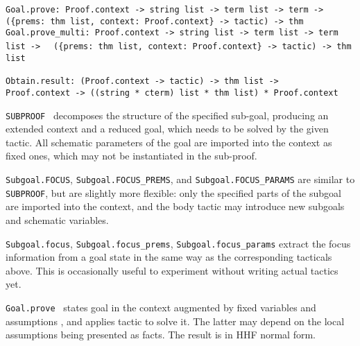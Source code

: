 \begin{isabellebody}
\begin{isamarkuptext}
  \begin{mldecls}
  \verb|Goal.prove: Proof.context -> string list -> term list -> term ->|\isasep\isanewline%
\verb|  ({prems: thm list, context: Proof.context} -> tactic) -> thm| \\
  \verb|Goal.prove_multi: Proof.context -> string list -> term list -> term list ->|\isasep\isanewline%
\verb|  ({prems: thm list, context: Proof.context} -> tactic) -> thm list| \\
  \end{mldecls}
  \begin{mldecls}
  \verb|Obtain.result: (Proof.context -> tactic) -> thm list ->|\isasep\isanewline%
\verb|  Proof.context -> ((string * cterm) list * thm list) * Proof.context| \\
  \end{mldecls}

  \begin{description}

  \item \verb|SUBPROOF|~ decomposes the structure
  of the specified sub-goal, producing an extended context and a
  reduced goal, which needs to be solved by the given tactic.  All
  schematic parameters of the goal are imported into the context as
  fixed ones, which may not be instantiated in the sub-proof.

  \item \verb|Subgoal.FOCUS|, \verb|Subgoal.FOCUS_PREMS|, and \verb|Subgoal.FOCUS_PARAMS| are similar to \verb|SUBPROOF|, but are
  slightly more flexible: only the specified parts of the subgoal are
  imported into the context, and the body tactic may introduce new
  subgoals and schematic variables.

  \item \verb|Subgoal.focus|, \verb|Subgoal.focus_prems|, \verb|Subgoal.focus_params| extract the focus information from a goal
  state in the same way as the corresponding tacticals above.  This is
  occasionally useful to experiment without writing actual tactics
  yet.

  \item \verb|Goal.prove|~ states goal  in the context augmented by fixed variables  and
  assumptions , and applies tactic  to solve
  it.  The latter may depend on the local assumptions being presented
  as facts.  The result is in HHF normal form.


\end{description}
\end{isamarkuptext}
\end{isabellebody}
